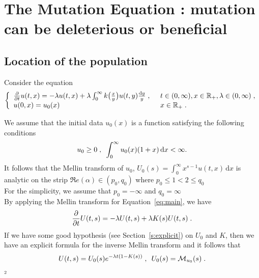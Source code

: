 \documentclass[11pt]{amsart}
\renewcommand{\Re}{\mathfrak{R}e}
\newcommand{\diff}{\,\mathrm{d}}
\begin{document}




\section{The Mutation Equation : mutation can be deleterious or beneficial}

\subsection{Location of the population}

Consider the equation
\begin{equation}\left\{
    \begin{array}{ll}
	\frac{\partial}{\partial t}u(t,x) = - \lambda u(t,x) + \lambda \int_{0}^{\infty} k\big( \frac{x}{y}\big)u(t,y) \frac{\mathrm dy}{y}
	\; , \enspace
	& t \in (0, \infty), x \in \mathbb{R}_+, \lambda \in (0, \infty) \; ,
	\\
	u(0, x) = u_0(x)
	& x \in \mathbb{R}_+
	\; .
    \end{array}
	\right.
    \label{eq:main}
\end{equation}

We assume that the initial data $u_0(x)$ is a function satisfying the following conditions 
$$ u_0 \geq 0 \eqsepv \int_0^\infty u_0(x)(1+x)\diff x < \infty.$$
It follows that the Mellin transform of $u_0$, $U_0(s)= \int_0^\infty x^{s-1}u(t,x)\diff x$ is analytic on the strip $\Re(\alpha) \in (p_0,q_0)$ where $p_0 \leq 1 < 2 \leq q_0$ \\
For the simplicity, we assume that 
$ p_0=-\infty$ and $q_0 = \infty$\\

By applying the Mellin transform for Equation~\eqref{eq:main}, we have
	\begin{equation}
		\frac{\partial}{\partial t} U(t,s) = - \lambda U(t,s) + \lambda K(s) U(t,s)
		\; .
        \label{eq:explicit_reconstruction}
	\end{equation}
If we have some good hypothesis (see Section~\ref{s:explicit}) on $U_0$ and $K$, then we have an explicit formula for the inverse Mellin transform and it follows that
    \begin{equation*}
        U(t,s) = U_0(s) e^{-\lambda t(1 - K(s) ) }
        \; , \enspace
        U_0(s) = \mathcal{M}_{u_0}(s)
        \; .
    \end{equation*}²
\end{document}
